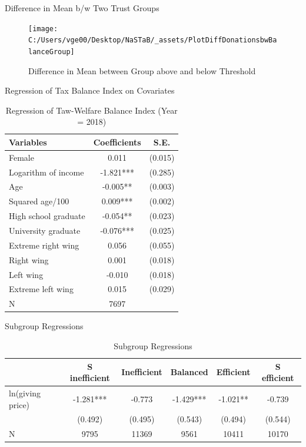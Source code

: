 \documentclass[
  ignorenonframetext,
]{beamer}
\begin{document}
\begin{frame}{Difference in Mean b/w Two Trust Groups}
\protect\hypertarget{difference-in-mean-bw-two-trust-groups-1}{}
\begin{figure}
\texttt{[image: C:/Users/vge00/Desktop/NaSTaB/\_assets/PlotDiffDonationsbwBalanceGroup]} \caption{Difference in Mean between Group above and below Threshold}\label{fig:unnamed-chunk-10}
\end{figure}
\end{frame}

\begin{frame}{Regression of Tax Balance Index on Covariates}
\protect\hypertarget{regression-of-tax-balance-index-on-covariates}{}
\begin{table}

\caption{\label{tab:kableRegBalanceidOnCovariate}Regression of Taw-Welfare Balance Index (Year = 2018)}
\centering
\begin{tabular}[t]{lcc}
\toprule
Variables & Coefficients & S.E.\\
\midrule
Female & 0.011 & (0.015)\\
Logarithm of income & -1.821*** & (0.285)\\
Age & -0.005** & (0.003)\\
Squared age/100 & 0.009*** & (0.002)\\
High school graduate & -0.054** & (0.023)\\
University graduate & -0.076*** & (0.025)\\
Extreme right wing & 0.056 & (0.055)\\
Right wing & 0.001 & (0.018)\\
Left wing & -0.010 & (0.018)\\
Extreme left wing & 0.015 & (0.029)\\
N & 7697 & \\
\bottomrule
\end{tabular}
\end{table}
\end{frame}

\begin{frame}{Subgroup Regressions}
\protect\hypertarget{subgroup-regressions-1}{}
\begin{table}

\caption{\label{tab:kableEstimateElasticityByBalanceGroup}Subgroup Regressions}
\centering
\fontsize{8}{10}\selectfont
\begin{tabular}[t]{lccccc}
\toprule
 & S inefficient & Inefficient & Balanced & Efficient & S efficient\\
\midrule
ln(giving price) & -1.281*** & -0.773 & -1.429*** & -1.021** & -0.739\\
 & (0.492) & (0.495) & (0.543) & (0.494) & (0.544)\\
N & 9795 & 11369 & 9561 & 10411 & 10170\\
\bottomrule
\end{tabular}
\end{table}
\end{frame}
\end{document}
